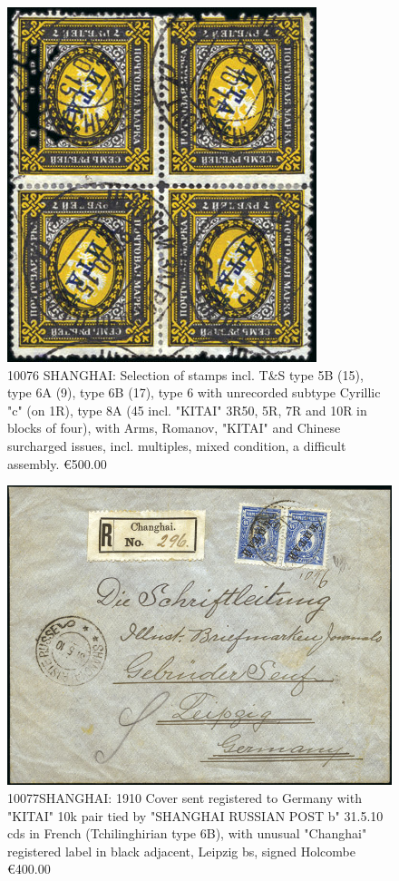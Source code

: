 \begin{figure}[htbp]
\centering
\includegraphics[width=.50\textwidth]{../russian-post-offices-in-china/10076.jpg}
\caption{
10076	SHANGHAI: Selection of stamps incl. T\&S type 5B (15), type 6A (9), 
type 6B (17), type 6 with unrecorded subtype Cyrillic "c" (on 1R), type 8A 
(45 incl. "KITAI" 3R50, 5R, 7R and 10R in blocks of four), with Arms, Romanov, 
"KITAI" and Chinese surcharged issues, incl. multiples, mixed condition, 
a difficult assembly.
\euro 500.00 
}  
\end{figure}


\begin{figure}[htbp]
\centering
\includegraphics[width=.95\textwidth]{../russian-post-offices-in-china/10077.jpg}
\caption{
10077SHANGHAI: 1910 Cover sent registered to Germany with "KITAI" 10k pair 
tied by "SHANGHAI RUSSIAN POST b" 31.5.10 cds in French (Tchilinghirian type 6B), 
with unusual "Changhai" registered label in black adjacent, Leipzig bs, signed 
Holcombe
\euro 400.00 
}  
\end{figure}
 
